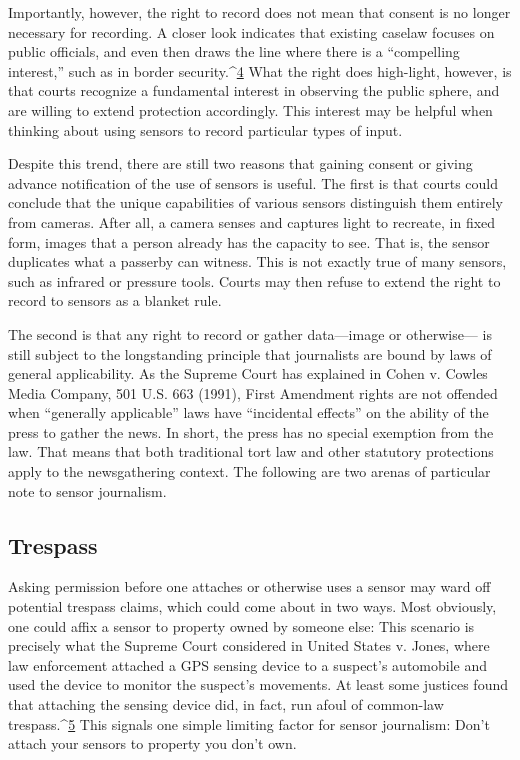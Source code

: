 Importantly, however, the right to record does not mean that consent is no
longer necessary for recording. A closer look indicates that existing caselaw
focuses on public officials, and even then draws the line where there is a
``compelling interest,'' such as in border security.^{\href{#endnotes-syed}{4}} What the right does high-light, however, is that courts recognize a fundamental interest in observing
the public sphere, and are willing to extend protection accordingly. This
interest may be helpful when thinking about using sensors to record particular
types of input.

Despite this trend, there are still two reasons that gaining consent or giving
advance notification of the use of sensors is useful. The first is that courts
could conclude that the unique capabilities of various sensors distinguish
them entirely from cameras. After all, a camera senses and captures light
to recreate, in fixed form, images that a person already has the capacity to
see. That is, the sensor duplicates what a passerby can witness. This is not
exactly true of many sensors, such as infrared or pressure tools. Courts may
then refuse to extend the right to record to sensors as a blanket rule.

The second is that any right to record or gather data—image or otherwise—
is still subject to the longstanding principle that journalists are bound by
laws of general applicability. As the Supreme Court has explained in Cohen
v. Cowles Media Company, 501 U.S. 663 (1991), First Amendment rights are
not offended when ``generally applicable'' laws have ``incidental effects'' on
the ability of the press to gather the news. In short, the press has no special
exemption from the law. That means that both traditional tort law and other
statutory protections apply to the newsgathering context. The following are
two arenas of particular note to sensor journalism.

\subsection{Trespass}
Asking permission before one attaches or otherwise uses a sensor may ward
off potential trespass claims, which could come about in two ways. Most
obviously, one could affix a sensor to property owned by someone else: This
scenario is precisely what the Supreme Court considered in United States v.
Jones, where law enforcement attached a GPS sensing device to a suspect's
automobile and used the device to monitor the suspect's movements. At least some justices found that attaching the sensing device did, in fact, run
afoul of common-law trespass.^{\href{#endnotes-syed}{5}} This signals one simple limiting factor for
sensor journalism: Don't attach your sensors to property you don't own.

